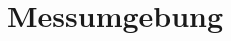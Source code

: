 \documentclass[a4paper, 11pt, toc=bibliography, toc=listof]{scrbook}
\begin{document}
	


	\appendix

	\chapter{Messumgebung} %
	\label{cha:Messumgebung}



	\backmatter

	\listoffigures{}
	\listoftables{}

	\nocite{*}
	
	

\end{document}
